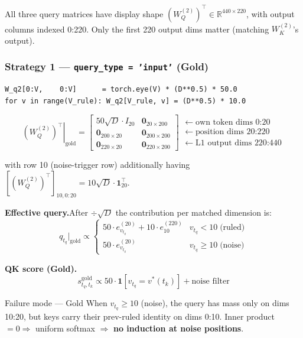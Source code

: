 \documentclass[11pt]{article}
\newcommand{\R}{\mathbb{R}}
\begin{document}
All three query matrices have display shape $(W_Q^{(2)})^\top\in\R^{440\times220}$, with output
columns indexed 0:220. Only the first 220 output dims matter (matching $W_K^{(2)}$'s output).

\subsubsection{Strategy 1 --- \texttt{query\_type = 'input'} (Gold)}

\begin{lstlisting}
W_q2[0:V,    0:V]      = torch.eye(V) * (D**0.5) * 50.0
for v in range(V_rule): W_q2[V_rule, v] = (D**0.5) * 10.0
\end{lstlisting}

\begin{equation}
\left.(W_Q^{(2)})^\top\right|_{\text{gold}}=
\begin{bmatrix}
50\sqrt{D}\cdot I_{20} & \mathbf{0}_{20\times200}\\
\mathbf{0}_{200\times20} & \mathbf{0}_{200\times200}\\
\mathbf{0}_{220\times20} & \mathbf{0}_{220\times200}
\end{bmatrix}
\begin{array}{l}
\leftarrow\text{own token dims }0\text{:}20\\
\leftarrow\text{position dims }20\text{:}220\\
\leftarrow\text{L1 output dims }220\text{:}440
\end{array}
\tag{17}
\end{equation}

with row 10 (noise-trigger row) additionally having
$[(W_Q^{(2)})^\top]_{10,0:20}=10\sqrt{D}\cdot\mathbf{1}_{20}^\top$.

\medskip
\textbf{Effective query.}\quad After $\div\sqrt{D}$ the contribution per matched dimension is:
\[
q_{t_q}\big|_{\text{gold}}\propto
\begin{cases}
50\cdot e_{v_{t_q}}^{(20)}+10\cdot e_{10}^{(220)} & v_{t_q}<10\;\text{(ruled)}\\
50\cdot e_{v_{t_q}}^{(20)} & v_{t_q}\geq10\;\text{(noise)}
\end{cases}
\tag{18}
\]

\textbf{QK score (Gold).}
\[
s_{t_q,t_k}^{\text{gold}}\propto 50\cdot\mathbf{1}[v_{t_q}=v^*(t_k)]+\text{noise filter}
\tag{19}
\]

\begin{warningbox}{Failure mode --- Gold}
When $v_{t_q}\geq10$ (noise), the query has mass only on dims 10:20, but keys carry their prev-ruled
identity on dims 0:10. Inner product $=0\Rightarrow$ uniform softmax $\Rightarrow$
\textbf{no induction at noise positions}.
\end{warningbox}
\end{document}
